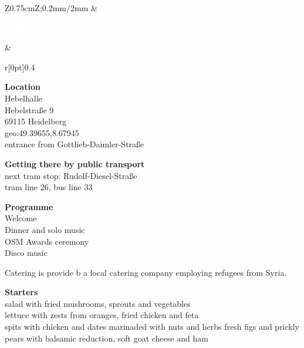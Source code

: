 \begin{landscape}
  \begin{center}
    \newlength\socialEventBoxWidth
    \setlength{\socialEventBoxWidth}{10.82cm}
    \newlength\socialEventSectionSep
    \setlength{\socialEventSectionSep}{\baselineskip}
    \noindent\begin{tabular}{Z{0.75cm}Z{\socialEventBoxWidth};{0.2mm/2mm}}
      &
      \tabularnewline
      \parbox[t]{\linewidth}{%
        \textcolor{white}{19:00}%
      }%
      &
      \begin{minipage}[t]{\socialEventBoxWidth}
        \noindent\begin{minipage}[t]{0.47\linewidth}
          \vspace{-0.56\baselineskip}
          \begin{wrapfigure}[6]{r}[0pt]{0.4\linewidth}%
            \vspace{-1\baselineskip}%
          \end{wrapfigure}%
          \textbf{Location}\\
          Hebelhalle\\
          Hebelstraße 9\\
          69115 Heidelberg\\
          geo:49.39655,8.67945\\
          entrance from Gottlieb-Daimler-Straße

          \vspace{\socialEventSectionSep}
          \textbf{Getting there by public transport}\\
          next tram stop: Rudolf-Diesel-Straße\\
          tram line 26, bus line 33

          \vspace{\socialEventSectionSep}
          \textbf{Programme}\\
          Welcome\\
          Dinner and solo music\\
          OSM Awards ceremony\\
          Disco music

          \vspace{\baselineskip}
          Catering is provide b a local catering company employing refugees from Syria.
        \end{minipage}
        \hfill
        \noindent\begin{minipage}[t]{0.47\linewidth}
          \textbf{Starters}\\
          salad with fried mushrooms, sprouts and vegetables\\
          lettuce with zests from oranges, fried chicken and feta\\
          spits with chicken and dates marinaded with nuts and herbs
          fresh figs and prickly pears with balsamic reduction, soft goat cheese and ham


\end{minipage}
\end{minipage}
\end{tabular}
\end{center}
\end{landscape}

